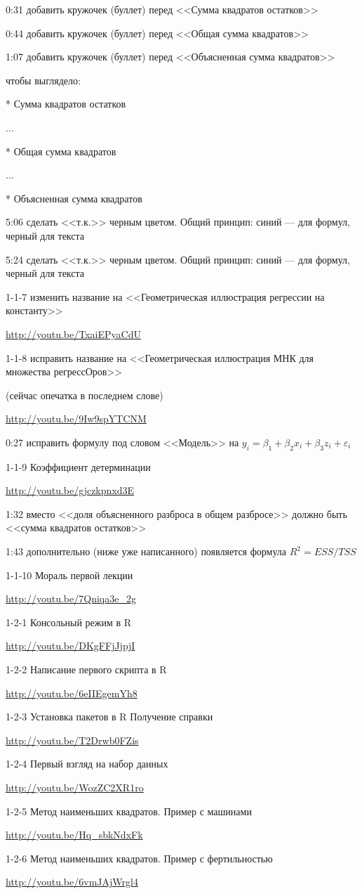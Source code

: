 \documentclass[12pt,a4paper]{article}
\begin{document}
0:31 добавить кружочек (буллет) перед <<Сумма квадратов остатков>>

0:44 добавить кружочек (буллет) перед <<Общая сумма квадратов>>

1:07 добавить кружочек (буллет) перед <<Объясненная сумма квадратов>>

чтобы выглядело:

* Сумма квадратов остатков

...

* Общая сумма квадратов

...

* Объясненная сумма квадратов


5:06 сделать <<т.к.>> черным цветом. Общий принцип: синий --- для формул, черный для текста

5:24 сделать <<т.к.>> черным цветом. Общий принцип: синий --- для формул, черный для текста


1-1-7 изменить название на <<Геометрическая иллюстрация регрессии на константу>>

\url{http://youtu.be/TxaiEPyaCdU}



1-1-8 исправить название на <<Геометрическая иллюстрация МНК для множества регрессОров>>

(сейчас опечатка в последнем слове) 

\url{http://youtu.be/9Iw9spYTCNM}

0:27 исправить формулу под словом <<Модель>> на $y_i=\beta_1+\beta_2 x_i +\beta_3 z_i + 
\varepsilon_i$


1-1-9 Коэффициент детерминации

\url{http://youtu.be/gjczkpnxd3E}

1:32 вместо <<доля объясненного разброса в общем разбросе>> должно быть <<сумма квадратов 
остатков>>

1:43 дополнительно (ниже уже написанного) появляется формула $R^2=ESS/TSS$



1-1-10 Мораль первой лекции 

\url{http://youtu.be/7Qniqa3e_2g}

1-2-1 Консольный режим в R

\url{http://youtu.be/DKgFFjJjpjI}


1-2-2 Написание первого скрипта в R

\url{http://youtu.be/6eIIEgemYh8}

1-2-3 Установка пакетов в R Получение справки

\url{http://youtu.be/T2Drwb0FZis}

1-2-4 Первый взгляд на набор данных

\url{http://youtu.be/WozZC2XR1ro}

1-2-5 Метод наименьших квадратов. Пример с машинами

\url{http://youtu.be/Hq_sbkNdxFk}

1-2-6 Метод наименьших квадратов. Пример с фертильностью

\url{http://youtu.be/6vmJAjWrgl4}
\end{document}
